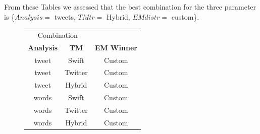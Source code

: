 \documentclass[12pt]{article}
\begin{document}
From these Tables we assessed that the best combination for the three parameter
is \{$Analysis =$ tweets, $TM tr =$ Hybrid, $EM distr =$ custom\}.
\begin{figure}
\centering
 \begin{minipage}{.45\textwidth}
 \centering
   \setlength{\tabcolsep}{0.5em}
    \begin{tabular}{cc|c}
    \toprule
    \multicolumn{2}{c|}{Combination} &  \\
    \textbf{Analysis} & \textbf{TM}    & \textbf{EM Winner} \\
    \midrule
    tweet & Swift & Custom \\
    tweet & Twitter & Custom \\
    tweet & Hybrid & Custom \\
    words & Swift & Custom \\
    words & Twitter & Custom \\
    words & Hybrid & Custom \\
    \bottomrule
    \end{tabular}%
    \label{tab:tab1}%
     


\end{minipage}
\end{figure}
\end{document}
